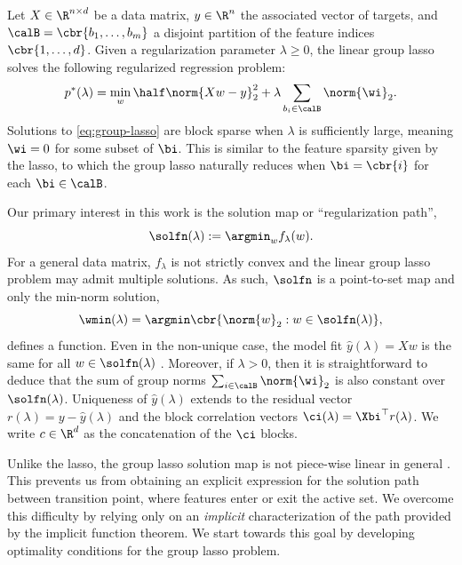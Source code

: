 

Let \( X \in \R^{n \times d} \) be a data matrix, \( y \in \R^n \) the
associated vector of targets,
and \( \calB = \cbr{b_1, \ldots, b_m} \) a disjoint partition of the feature indices
\( \cbr{1, \ldots, d} \).
Given a regularization parameter \( \lambda \geq 0 \), the linear group lasso
solves the following regularized regression problem:
\begin{equation}\label{eq:group-lasso}
	p^*(\lambda) = \min_{w} \half \norm{X w - y}_2^2 + \lambda \sum_{b_i \in \calB} \norm{\wi}_2.
\end{equation}
Solutions to \cref{eq:group-lasso} are block sparse when \( \lambda \) is sufficiently large, meaning \( \wi = 0 \) for some subset of \( \bi \).
This is similar to the feature sparsity given by the lasso,
to which the group lasso naturally reduces when \( \bi = \cbr{i} \) for each
\( \bi \in \calB \).

Our primary interest in this work is the solution map or
``regularization path'',
\[
	\solfn(\lambda) := \argmin_w f_\lambda(w).
\]
For a general data matrix, \( f_\lambda \) is not strictly convex and
the linear group lasso problem may admit multiple solutions.
As such, \( \solfn \) is a point-to-set map and
only the min-norm solution,
\[
	\wmin(\lambda) = \argmin \cbr{ \norm{w}_2 : w \in \solfn(\lambda) },
\]
defines a function.
Even in the non-unique case, the model fit \( \hat y(\lambda) = X w \) is the
same for all \( w \in \solfn(\lambda) \) \citep[Lemma 2]{vaiter2012dof}.
Moreover, if \( \lambda > 0 \), then it is straightforward to deduce that the sum of group norms
\( \sum_{i \in \calB} \norm{\wi}_2 \) is also constant over \( \solfn(\lambda) \).
Uniqueness of \( \hat y(\lambda) \) extends to the residual vector
\( r(\lambda) = y - \hat y(\lambda) \)
and the block correlation vectors \( \ci(\lambda) = \Xbi^\top r(\lambda) \).
We write \( c \in \R^d \) as the concatenation of the \( \ci \)
blocks.

Unlike the lasso, the group lasso solution map is not piece-wise linear
in general \citep{yuan2006model}.
This prevents us from obtaining an explicit expression for the solution
path between transition point, where features enter or exit the active set.
We overcome this difficulty by relying only on an \emph{implicit} characterization
of the path provided by the implicit function theorem.
We start towards this goal by developing optimality conditions for the group
lasso problem.

